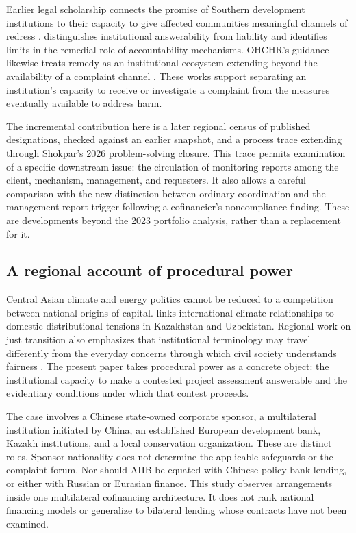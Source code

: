 \documentclass[11pt,a4paper]{article}
\begin{document}
Earlier legal scholarship connects the promise of Southern development institutions to their capacity to give affected communities meaningful channels of redress \citep{mirza2018}. \citet{lorenzo2024} distinguishes institutional answerability from liability and identifies limits in the remedial role of accountability mechanisms. OHCHR's guidance likewise treats remedy as an institutional ecosystem extending beyond the availability of a complaint channel \citep{ohchr2022}. These works support separating an institution's capacity to receive or investigate a complaint from the measures eventually available to address harm.

The incremental contribution here is a later regional census of published designations, checked against an earlier snapshot, and a process trace extending through Shokpar's 2026 problem-solving closure. This trace permits examination of a specific downstream issue: the circulation of monitoring reports among the client, mechanism, management, and requesters. It also allows a careful comparison with the new distinction between ordinary coordination and the management-report trigger following a cofinancier's noncompliance finding. These are developments beyond the 2023 portfolio analysis, rather than a replacement for it.

\subsection{A regional account of procedural power}
Central Asian climate and energy politics cannot be reduced to a competition between national origins of capital. \citet{skalamera2025} links international climate relationships to domestic distributional tensions in Kazakhstan and Uzbekistan. Regional work on just transition also emphasizes that institutional terminology may travel differently from the everyday concerns through which civil society understands fairness \citep{ponedelnik2026}. The present paper takes procedural power as a concrete object: the institutional capacity to make a contested project assessment answerable and the evidentiary conditions under which that contest proceeds.

The case involves a Chinese state-owned corporate sponsor, a multilateral institution initiated by China, an established European development bank, Kazakh institutions, and a local conservation organization. These are distinct roles. Sponsor nationality does not determine the applicable safeguards or the complaint forum. Nor should AIIB be equated with Chinese policy-bank lending, or either with Russian or Eurasian finance. This study observes arrangements inside one multilateral cofinancing architecture. It does not rank national financing models or generalize to bilateral lending whose contracts have not been examined.
\end{document}
